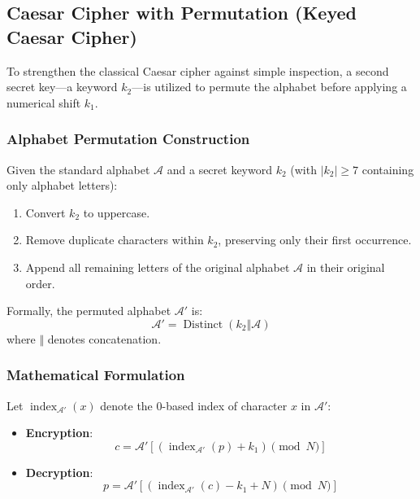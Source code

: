 \documentclass[12pt,a4paper]{article}
\begin{document}
\subsection{Caesar Cipher with Permutation (Keyed Caesar Cipher)}
To strengthen the classical Caesar cipher against simple inspection, a second secret key---a keyword $k_2$---is utilized to permute the alphabet before applying a numerical shift $k_1$.

\subsubsection{Alphabet Permutation Construction}
Given the standard alphabet $\mathcal{A}$ and a secret keyword $k_2$ (with $|k_2| \ge 7$ containing only alphabet letters):
\begin{enumerate}
    \item Convert $k_2$ to uppercase.
    \item Remove duplicate characters within $k_2$, preserving only their first occurrence.
    \item Append all remaining letters of the original alphabet $\mathcal{A}$ in their original order.
\end{enumerate}
Formally, the permuted alphabet $\mathcal{A}'$ is:
\begin{equation}
    \mathcal{A}' = \operatorname{Distinct}(k_2 \mathbin{\Vert} \mathcal{A})
\end{equation}
where $\mathbin{\Vert}$ denotes concatenation.

\subsubsection{Mathematical Formulation}
Let $\operatorname{index}_{\mathcal{A}'}(x)$ denote the 0-based index of character $x$ in $\mathcal{A}'$:
\begin{itemize}
    \item \textbf{Encryption}:
    \begin{equation}
        c = \mathcal{A}'\left[ (\operatorname{index}_{\mathcal{A}'}(p) + k_1) \pmod N \right]
    \end{equation}
    \item \textbf{Decryption}:
    \begin{equation}
        p = \mathcal{A}'\left[ (\operatorname{index}_{\mathcal{A}'}(c) - k_1 + N) \pmod N \right]
    \end{equation}
\end{itemize}
\end{document}
